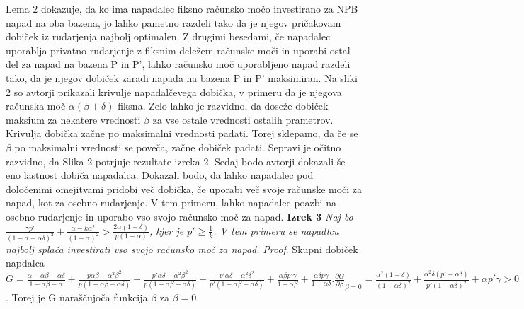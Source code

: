 \documentclass{acm_proc_article-sp}
\begin{document}
Lema 2 dokazuje, da ko ima napadalec fiksno računsko močo investirano za NPB napad na oba bazena, jo lahko pametno razdeli tako da je njegov pričakovam dobiček iz rudarjenja najbolj optimalen. Z drugimi besedami, če napadalec uporablja privatno rudarjenje z fiksnim deležem računske moči in uporabi ostal del za napad na bazena P in P', lahko računsko moč uporabljeno napad razdeli tako, da je njegov dobiček zaradi napada na bazena P in P' maksimiran. Na sliki 2 so avtorji prikazali krivulje napadalčevega dobička, v primeru da je njegova računska moč $\alpha(\beta + \delta)$ fiksna. Zelo lahko je razvidno, da doseže dobiček maksium za nekatere vrednosti $\beta$ za vse ostale vrednosti ostalih prametrov. Krivulja dobička začne po maksimalni vrednosti padati. Torej sklepamo, da če se $\beta$ po maksimalni vrednosti se poveča, začne dobiček padati. Sepravi je očitno razvidno, da Slika 2 
potrjuje rezultate izreka 2. Sedaj bodo avtorji dokazali še eno lastnost dobiča napadalca. Dokazali bodo, da lahko napadalec pod določenimi omejitvami pridobi več dobička, če uporabi  več svoje računske moči za napad, kot za osebno rudarjenje. V tem primeru, lahko napadalec poazbi na osebno rudarjenje in uporabo vso svojo računsko moč za napad.
\newline
\newline
\textbf{Izrek 3} \textit{Naj bo $\frac{\gamma p'}{(1 - \alpha + \alpha\delta)^2} + \frac{\alpha - k \alpha^2}{(1 - \alpha)^2} > \frac{2\alpha(1 - \delta)}{p(1 - \alpha)}$, kjer je $p' \geq \frac{1}{k}$. V tem primeru se napadlcu najbolj splača investirati vso svojo računsko moč za napad.}
\newline
\newline
\textit{Proof}. Skupni dobiček napdalca $G = \frac{\alpha - \alpha\beta - \alpha\delta}{1 - \alpha\beta - \alpha} + \frac{p\alpha\beta - \alpha^2\beta^2}{p(1 - \alpha\beta - \alpha\delta)} + \frac{p'\alpha\delta - \alpha^2\beta^2}{p(1 - \alpha\beta - \alpha\delta)} + \frac{p'\alpha\delta - \alpha^2\delta^2}{p'(1- \alpha\beta - \alpha\delta)} + \frac{\alpha\beta p' \gamma}{1 - \alpha\beta} + \frac{\alpha\delta p \gamma}{1 - \alpha\delta}. \frac{\partial G}{\partial \beta}_{\beta=0} = \frac{\alpha^2(1 - \delta)}{(1 - \alpha\delta)^2} + \frac{\alpha^2\delta(p' - \alpha\delta)}{p'(1- \alpha\delta)^2} + \alpha p' \gamma > 0$. Torej je G naraščujoča funkcija $\beta$ za $\beta = 0.$
\end{document}
